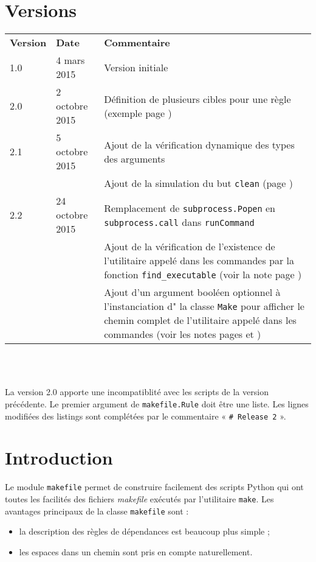 \documentclass[a4paper,11pt]{extarticle}
\begin{document}
\section{Versions}
  \begin{tabular}{llp{10.5cm}}
    \textbf{Version} & \textbf{Date} & \textbf{Commentaire}\\
    1.0 & 4 mars 2015 & Version initiale \\
    2.0 & 2 octobre 2015 & Définition de plusieurs cibles pour une règle (exemple page \pageref{plusieursCibles})\\
    2.1 & 5 octobre 2015 & Ajout de la vérification dynamique des types des arguments\\
        &                & Ajout de la simulation du but \texttt{clean} (page \pageref{simulationButClean})\\
    2.2 & 24 octobre 2015 & Remplacement de \texttt{subprocess.Popen} en \texttt{subprocess.call} dans \texttt{runCommand}\\
        &                & Ajout de la vérification de l'existence de l'utilitaire appelé dans les commandes par la fonction \texttt{find\_executable} (voir la note page \pageref{verifUtilitaire})\\
        &                & Ajout d'un argument booléen optionnel à l'instanciation d" la classe \texttt{Make} pour afficher le chemin complet de l'utilitaire appelé dans les commandes (voir les notes pages \pageref{logUtilityToolPath} et \pageref{logUtilityToolPath2})\\
  \end{tabular}
\\~


La version 2.0 apporte une incompatiblité avec les scripts de la version précédente. Le premier argument de \texttt{makefile.Rule} doit être une liste. Les lignes modifiées des listings sont complétées par le commentaire « \texttt{\# Release 2} ».


\section{Introduction}

Le module \texttt{makefile} permet de construire facilement des scripts Python qui ont toutes les facilités des fichiers \emph{makefile} exécutés par l'utilitaire \texttt{make}. Les avantages principaux de la classe \texttt{makefile} sont :
\begin{itemize}
  \item la description des règles de dépendances est beaucoup plus simple ;
  \item les espaces dans un chemin sont pris en compte naturellement. 
\end{itemize}
\end{document}
